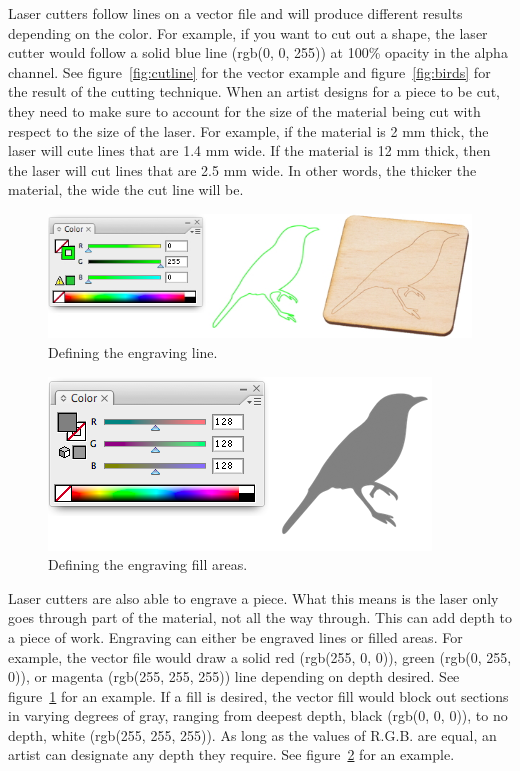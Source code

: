 \documentclass[12pt singlecol]{article}
\begin{document}
\begin{flushleft}
Laser cutters follow lines on a vector file and will produce different results depending on the color. For example, if you want to cut out a shape, the laser cutter would follow a solid blue line (rgb(0, 0, 255)) at 100\% opacity in the alpha channel. \cite{PonokoStarter13} See figure~\ref{fig:cutline}  for the vector example and figure~\ref{fig:birds} for the result of the cutting technique. When an artist designs for a piece to be cut, they need to make sure to account for the size of the material being cut with respect to the size of the laser. For example, if the material is 2 mm thick, the laser will cute lines that are 1.4 mm wide. If the material is 12 mm thick, then the laser will cut lines that are 2.5 mm wide. In other words, the thicker the material, the wide the cut line will be. \cite{agan12}

\begin{figure}
  \centering  
  \includegraphics[width=\linewidth]{engrave}
  \caption{Defining the engraving line. \cite{PonokoAdvance13}}
  \label{fig:engrave}
\end{figure}	

\begin{figure}
  \centering  
  \includegraphics[width=\linewidth]{fill}
  \caption{Defining the engraving fill areas. \cite{PonokoAdvance13}}
  \label{fig:fill}
\end{figure}	

Laser cutters are also able to engrave a piece. What this means is the laser only goes through part of the material, not all the way through. This can add depth to a piece of work. Engraving can either be engraved lines or filled areas. For example, the vector file would draw a solid red (rgb(255, 0, 0)), green (rgb(0, 255, 0)), or magenta (rgb(255, 255, 255)) line depending on depth desired. See figure~\ref{fig:engrave} for an example. If a fill is desired, the vector fill would block out sections in varying degrees of gray, ranging from deepest depth, black (rgb(0, 0, 0)), to no depth, white (rgb(255, 255, 255)). As long as the values of R.G.B. are equal, an artist can designate any depth they require. See figure~\ref{fig:fill} for an example.


\end{flushleft}
\end{document}
